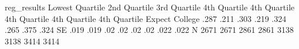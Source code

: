 	reg_results							
	Lowest Quartile	2nd Quartile	3rd Quartile	4th Quartile	4th Quartile	4th Quartile	4th Quartile	4th Quartile
Expect College	.287	.211	.303	.219	.324	.265	.375	.324
SE	.019	.019	.02	.02	.02	.02	.022	.022
N	2671	2671	2861	2861	3138	3138	3414	3414
